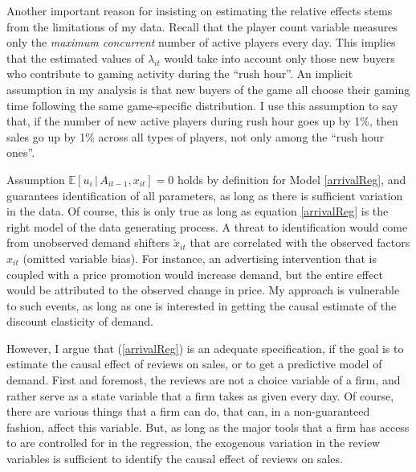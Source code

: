 \documentclass[
  12pt,
  pagebackref]{article}
\begin{document}
Another important reason for insisting on estimating the relative
effects stems from the limitations of my data. Recall that the player
count variable measures only the \emph{maximum concurrent} number of
active players every day. This implies that the estimated values of
\(\lambda_{it}\) would take into account only those new buyers who
contribute to gaming activity during the ``rush hour''. An implicit
assumption in my analysis is that new buyers of the game all choose
their gaming time following the same game-specific distribution. I use
this assumption to say that, if the number of new active players during
rush hour goes up by 1\%, then sales go up by 1\% across all types of
players, not only among the ``rush hour ones''.

Assumption \(\mathbb{E}\left[u_i\,|\,A_{it-1}, x_{it} \right] = 0\)
holds by definition for Model \ref{arrivalReg}, and guarantees
identification of all parameters, as long as there is sufficient
variation in the data. Of course, this is only true as long as equation
\ref{arrivalReg} is the right model of the data generating process. A
threat to identification would come from unobserved demand shifters
\(\tilde x_{it}\) that are correlated with the observed factors
\(x_{it}\) (omitted variable bias). For instance, an advertising
intervention that is coupled with a price promotion would increase
demand, but the entire effect would be attributed to the observed change
in price. My approach is vulnerable to such events, as long as one is
interested in getting the causal estimate of the discount elasticity of
demand.

However, I argue that (\ref{arrivalReg}) is an adequate specification,
if the goal is to estimate the causal effect of reviews on sales, or to
get a predictive model of demand. First and foremost, the reviews are
not a choice variable of a firm, and rather serve as a state variable
that a firm takes as given every day. Of course, there are various
things that a firm can do, that can, in a non-guaranteed fashion, affect
this variable. But, as long as the major tools that a firm has access to
are controlled for in the regression, the exogenous variation in the
review variables is sufficient to identify the causal effect of reviews
on sales.
\end{document}
